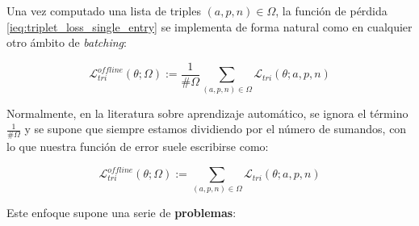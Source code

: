 Una vez computado una lista de triples $(a, p, n) \in \Omega$, la función de pérdida \eqref{ieq:triplet_loss_single_entry} se implementa de forma natural como en cualquier otro ámbito de \textit{batching}:

\begin{equation}
    \mathcal{L}_{tri}^{offline}(\theta; \Omega) := \frac{1}{\#\Omega} \sum_{(a, p, n) \in \Omega} \mathcal{L}_{tri}(\theta; a, p, n)
\end{equation}

\begin{observacion}

Normalmente, en la literatura sobre aprendizaje automático, se ignora el término $\frac{1}{\#\Omega}$ y se supone que siempre estamos dividiendo por el número de sumandos, con lo que nuestra función de error suele escribirse como:

\begin{equation}
    \mathcal{L}_{tri}^{offline}(\theta; \Omega) := \sum_{(a, p, n) \in \Omega} \mathcal{L}_{tri}(\theta; a, p, n)
\end{equation}


\end{observacion}

Este enfoque supone una serie de \textbf{problemas}:

